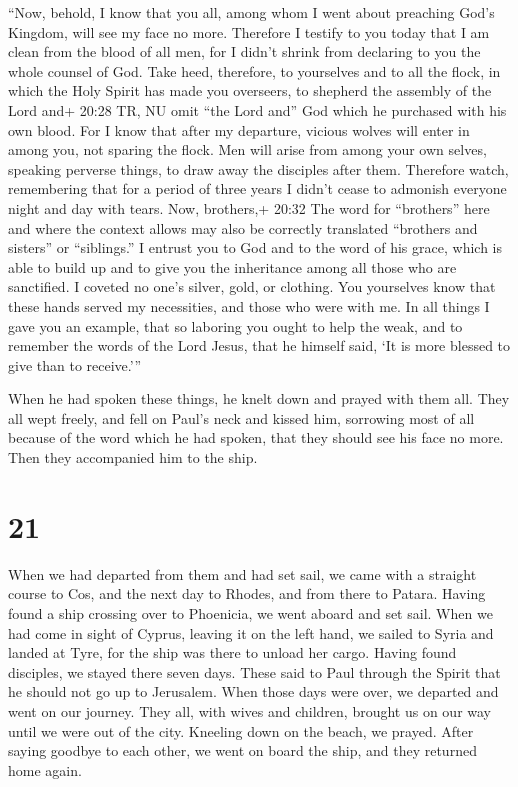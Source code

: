  ``Now, behold, I know that you all, among whom I went
about preaching God's Kingdom, will see my face no more. 
Therefore I testify to you today that I am clean from the blood of all
men,  for I didn't shrink from declaring to you the whole
counsel of God.  Take heed, therefore, to yourselves and to
all the flock, in which the Holy Spirit has made you overseers, to
shepherd the assembly of the Lord and+ 20:28 TR, NU omit ``the Lord
and'' God which he purchased with his own blood.  For I
know that after my departure, vicious wolves will enter in among you,
not sparing the flock.  Men will arise from among your own
selves, speaking perverse things, to draw away the disciples after them.
 Therefore watch, remembering that for a period of three
years I didn't cease to admonish everyone night and day with tears.
 Now, brothers,+ 20:32 The word for ``brothers'' here and
where the context allows may also be correctly translated ``brothers and
sisters'' or ``siblings.'' I entrust you to God and to the word of his
grace, which is able to build up and to give you the inheritance among
all those who are sanctified.  I coveted no one's silver,
gold, or clothing.  You yourselves know that these hands
served my necessities, and those who were with me.  In all
things I gave you an example, that so laboring you ought to help the
weak, and to remember the words of the Lord Jesus, that he himself said,
`It is more blessed to give than to receive.'''

 When he had spoken these things, he knelt down and prayed
with them all.  They all wept freely, and fell on Paul's
neck and kissed him,  sorrowing most of all because of the
word which he had spoken, that they should see his face no more. Then
they accompanied him to the ship.

\hypertarget{section-20}{%
\section{21}\label{section-20}}

 When we had departed from them and had set sail, we came
with a straight course to Cos, and the next day to Rhodes, and from
there to Patara.  Having found a ship crossing over to
Phoenicia, we went aboard and set sail.  When we had come in
sight of Cyprus, leaving it on the left hand, we sailed to Syria and
landed at Tyre, for the ship was there to unload her cargo. 
Having found disciples, we stayed there seven days. These said to Paul
through the Spirit that he should not go up to Jerusalem. 
When those days were over, we departed and went on our journey. They
all, with wives and children, brought us on our way until we were out of
the city. Kneeling down on the beach, we prayed.  After
saying goodbye to each other, we went on board the ship, and they
returned home again.

